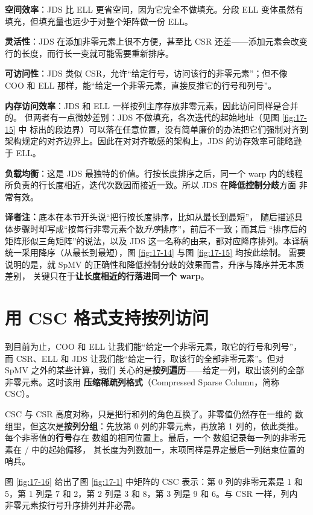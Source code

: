 \textbf{空间效率}：JDS 比 ELL 更省空间，因为它完全不做填充。分段 ELL 变体虽然有
填充，但填充量也远少于对整个矩阵做一份 ELL。

\textbf{灵活性}：JDS 在添加非零元素上很不方便，甚至比 CSR 还差——添加元素会改变
行的长度，而行长一变就可能需要重新排序。

\textbf{可访问性}：JDS 类似 CSR，允许“给定行号，访问该行的非零元素”；但不像 COO 和
ELL 那样，能“给定一个非零元素，直接反推它的行号和列号”。

\textbf{内存访问效率}：JDS 和 ELL 一样按列主序存放非零元素，因此访问同样是合并的。
但两者有一点微妙差别：JDS 不做填充，各次迭代的起始地址（见图 \ref{fig:17-15} 中
 标出的段边界）可以落在任意位置，没有简单廉价的办法把它们强制对齐到
架构规定的对齐边界上。因此在对对齐敏感的架构上，JDS 的访存效率可能略逊于 ELL。

\textbf{负载均衡}：这是 JDS 最独特的价值。行按长度排序之后，同一个 warp 内的线程
所负责的行长度相近，迭代次数因而接近一致。所以 JDS 在\textbf{降低控制分歧}方面
非常有效。

\noindent\textbf{译者注：}底本在本节开头说“把行按长度排序，比如从最长到最短”，
随后描述具体步骤时却写成“按每行非零元素个数\emph{升序}排序”，前后不一致；而其后
“排序后的矩阵形似三角矩阵”的说法，以及 JDS 这一名称的由来，都对应降序排列。本译稿
统一采用降序（从最长到最短），图 \ref{fig:17-14} 与图 \ref{fig:17-15} 均按此绘制。
需要说明的是，就 SpMV 的正确性和降低控制分歧的效果而言，升序与降序并无本质差别，
关键只在于\textbf{让长度相近的行落进同一个 warp}。

\section{用 CSC 格式支持按列访问}
\label{sec:spmv-csc}

到目前为止，COO 和 ELL 让我们能“给定一个非零元素，取它的行号和列号”，而 CSR、ELL
和 JDS 让我们能“给定一行，取该行的全部非零元素”。但对 SpMV 之外的某些计算，我们
关心的是\textbf{按列遍历}——给定一列，取出该列的全部非零元素。这时该用
\textbf{压缩稀疏列格式}（Compressed Sparse Column，简称 CSC）。

CSC 与 CSR 高度对称，只是把行和列的角色互换了。非零值仍然存在一维的 
数组里，但这次是\textbf{按列分组}：先放第 0 列的非零元素，再放第 1 列的，依此类推。
每个非零值的\textbf{行号}存在  数组的相同位置上。最后，一个
 数组记录每一列的非零元素在 / 中的起始偏移，
其长度为列数加一，末项同样是界定最后一列结束位置的哨兵。

图 \ref{fig:17-16} 给出了图 \ref{fig:17-1} 中矩阵的 CSC 表示：第 0 列的非零元素是
1 和 5，第 1 列是 7 和 2，第 2 列是 3 和 8，第 3 列是 9 和 6。与 CSR 一样，列内
非零元素按行号升序排列并非必需。

